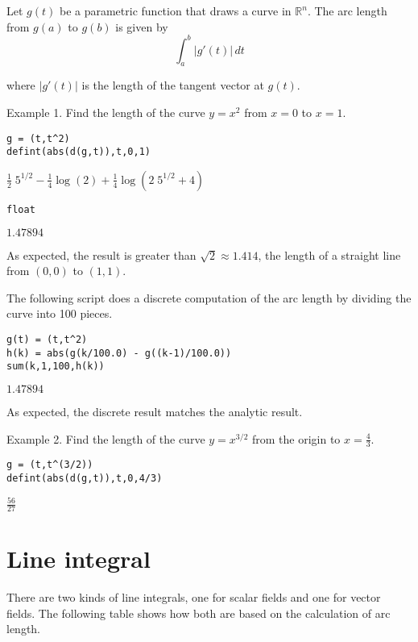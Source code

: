 \documentclass[12pt]{article}
\begin{document}
Let $g(t)$ be a parametric function that draws a curve in $\mathbb R^n$.
The arc length from $g(a)$ to $g(b)$ is given by
\begin{equation*}
\int_a^b|g'(t)|\,dt
\end{equation*}

where $|g'(t)|$ is the length of the tangent vector at $g(t)$.

\bigskip
Example 1.
Find the length of the curve $y=x^2$ from $x=0$ to $x=1$.

{\color{blue}
\begin{verbatim}
g = (t,t^2)
defint(abs(d(g,t)),t,0,1)
\end{verbatim}}

$
\tfrac{1}{2}\;5^{1/2}
-\tfrac{1}{4}\log(2)
+\tfrac{1}{4}\log(2\;5^{1/2}+4)
$

{\color{blue}
\begin{verbatim}
float
\end{verbatim}}

$1.47894$

\bigskip
As expected, the result is greater than $\sqrt2\approx1.414$,
the length of a straight line from $(0,0)$ to $(1,1)$.

\bigskip
The following script does a discrete computation of the arc length
by dividing the curve into 100 pieces.

{\color{blue}
\begin{verbatim}
g(t) = (t,t^2)
h(k) = abs(g(k/100.0) - g((k-1)/100.0))
sum(k,1,100,h(k))
\end{verbatim}}

$1.47894$

\bigskip
As expected, the discrete result matches the analytic result.

\bigskip
Example 2.
Find the length of the curve $y=x^{3/2}$ from the origin to
$x=\tfrac{4}{3}$.

{\color{blue}
\begin{verbatim}
g = (t,t^(3/2))
defint(abs(d(g,t)),t,0,4/3)
\end{verbatim}}

$\displaystyle \tfrac{56}{27}$

\newpage

\section{Line integral}

There are two kinds of line integrals,
one for scalar fields and one for vector fields.
The following table shows how both are based on the calculation of
arc length.
\end{document}
